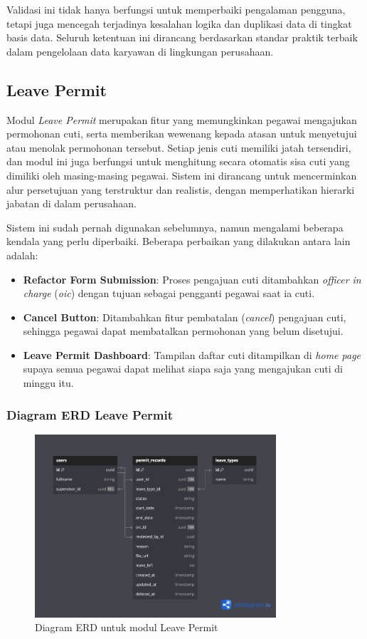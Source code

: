 Validasi ini tidak hanya berfungsi untuk memperbaiki pengalaman pengguna, tetapi juga mencegah terjadinya kesalahan logika dan duplikasi data di tingkat basis data. Seluruh ketentuan ini dirancang berdasarkan standar praktik terbaik dalam pengelolaan data karyawan di lingkungan perusahaan.

\subsection{Leave Permit}
Modul \textit{Leave Permit} merupakan fitur yang memungkinkan pegawai mengajukan permohonan cuti, serta memberikan wewenang kepada atasan untuk menyetujui atau menolak permohonan tersebut. Setiap jenis cuti memiliki jatah tersendiri, dan modul ini juga berfungsi untuk menghitung secara otomatis sisa cuti yang dimiliki oleh masing-masing pegawai. Sistem ini dirancang untuk mencerminkan alur persetujuan yang terstruktur dan realistis, dengan memperhatikan hierarki jabatan di dalam perusahaan.

Sistem ini sudah pernah digunakan sebelumnya, namun mengalami beberapa kendala yang perlu diperbaiki. Beberapa perbaikan yang dilakukan antara lain adalah:
\begin{itemize}
    \item \textbf{Refactor Form Submission}: Proses pengajuan cuti ditambahkan \textit{officer in charge} (\textit{oic}) dengan tujuan sebagai pengganti pegawai saat ia cuti.
    \item \textbf{Cancel Button}: Ditambahkan fitur pembatalan (\textit{cancel}) pengajuan cuti, sehingga pegawai dapat membatalkan permohonan yang belum disetujui.
    \item \textbf{Leave Permit Dashboard}: Tampilan daftar cuti ditampilkan di \textit{home page} supaya semua pegawai dapat melihat siapa saja yang mengajukan cuti di minggu itu.
\end{itemize}


\subsubsection{Diagram ERD Leave Permit}
\begin{figure}[H]
    \centering
    \includegraphics[width=0.8\textwidth]{assets/pics/fig_erd_leave_permit.png}
    \caption{Diagram ERD untuk modul Leave Permit}
    \label{fig:erd_leave_permit}
\end{figure}

